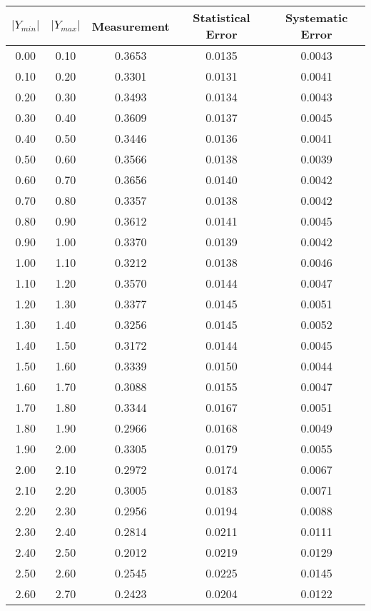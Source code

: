 \begin{tabular}{|c|c||c|c|c|}
\hline
$|Y_{min}|$ & $|Y_{max}|$ & Measurement & Statistical Error & Systematic Error \\ \hline
   0.00 &    0.10 &  0.3653 &  0.0135 &  0.0043 \\ 
   0.10 &    0.20 &  0.3301 &  0.0131 &  0.0041 \\ 
   0.20 &    0.30 &  0.3493 &  0.0134 &  0.0043 \\ 
   0.30 &    0.40 &  0.3609 &  0.0137 &  0.0045 \\ 
   0.40 &    0.50 &  0.3446 &  0.0136 &  0.0041 \\ 
   0.50 &    0.60 &  0.3566 &  0.0138 &  0.0039 \\ 
   0.60 &    0.70 &  0.3656 &  0.0140 &  0.0042 \\ 
   0.70 &    0.80 &  0.3357 &  0.0138 &  0.0042 \\ 
   0.80 &    0.90 &  0.3612 &  0.0141 &  0.0045 \\ 
   0.90 &    1.00 &  0.3370 &  0.0139 &  0.0042 \\ 
   1.00 &    1.10 &  0.3212 &  0.0138 &  0.0046 \\ 
   1.10 &    1.20 &  0.3570 &  0.0144 &  0.0047 \\ 
   1.20 &    1.30 &  0.3377 &  0.0145 &  0.0051 \\ 
   1.30 &    1.40 &  0.3256 &  0.0145 &  0.0052 \\ 
   1.40 &    1.50 &  0.3172 &  0.0144 &  0.0045 \\ 
   1.50 &    1.60 &  0.3339 &  0.0150 &  0.0044 \\ 
   1.60 &    1.70 &  0.3088 &  0.0155 &  0.0047 \\ 
   1.70 &    1.80 &  0.3344 &  0.0167 &  0.0051 \\ 
   1.80 &    1.90 &  0.2966 &  0.0168 &  0.0049 \\ 
   1.90 &    2.00 &  0.3305 &  0.0179 &  0.0055 \\ 
   2.00 &    2.10 &  0.2972 &  0.0174 &  0.0067 \\ 
   2.10 &    2.20 &  0.3005 &  0.0183 &  0.0071 \\ 
   2.20 &    2.30 &  0.2956 &  0.0194 &  0.0088 \\ 
   2.30 &    2.40 &  0.2814 &  0.0211 &  0.0111 \\ 
   2.40 &    2.50 &  0.2012 &  0.0219 &  0.0129 \\ 
   2.50 &    2.60 &  0.2545 &  0.0225 &  0.0145 \\ 
   2.60 &    2.70 &  0.2423 &  0.0204 &  0.0122 \\ 

\end{tabular}
